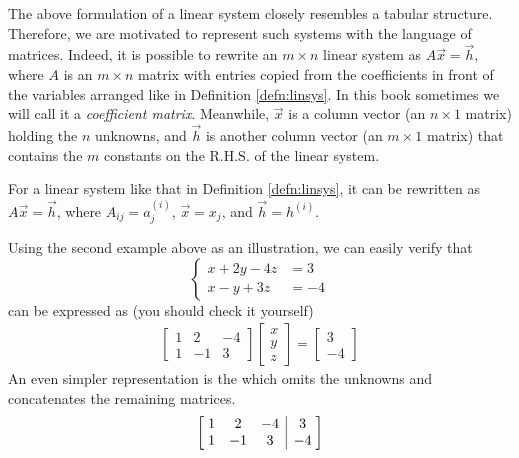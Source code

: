 The above formulation of a linear system closely resembles a tabular structure. Therefore, we are motivated to represent such systems with the language of matrices. Indeed, it is possible to rewrite an $m \times n$ linear system as $A\vec{x} = \vec{h}$, where $A$ is an $m \times n$ matrix with entries copied from the coefficients in front of the variables arranged like in Definition \ref{defn:linsys}. In this book sometimes we will call it a \textit{coefficient matrix}. Meanwhile, $\vec{x}$ is a column vector (an $n \times 1$ matrix) holding the $n$ unknowns, and $\vec{h}$ is another column vector (an $m \times 1$ matrix) that contains the $m$ constants on the R.H.S. of the linear system.
\begin{proper}
\label{proper:linsysmat}
For a linear system like that in Definition \ref{defn:linsys}, it can be rewritten as $A\vec{x} = \vec{h}$, where $A_{ij} = a_{j}^{(i)}$, $\vec{x} = x_j$, and $\vec{h} = h^{(i)}$.
\end{proper}
Using the second example above as an illustration, we can easily verify that
\begin{equation*}
\begin{cases}
x + 2y - 4z &= 3 \\
x - y + 3z &= -4
\end{cases}   
\end{equation*}
can be expressed as (you should check it yourself)
\begin{align*}
\begin{bmatrix}
1 & 2 & -4 \\
1 & -1 & 3 
\end{bmatrix}
\begin{bmatrix}
x \\
y \\
z
\end{bmatrix}
=
\begin{bmatrix}
3 \\
-4
\end{bmatrix}
\end{align*}
An even simpler representation is the  which omits the unknowns and concatenates the remaining matrices.
\begin{equation*}
\left[\begin{array}{@{\;}ccc|c@{\;}}
1 & 2 & -4 & 3\\
1 & -1 & 3 & -4
\end{array}\right]
\end{equation*}



